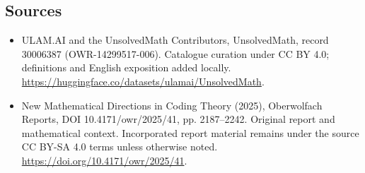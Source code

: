 \documentclass[11pt]{article}
\begin{document}
\subsection{Sources}
\begin{itemize}
\item[\hypertarget{source:30006387:1}{S1}] ULAM.AI and the UnsolvedMath Contributors, UnsolvedMath, record 30006387 (OWR-14299517-006). Catalogue curation under CC BY 4.0; definitions and English exposition added locally.
\url{https://huggingface.co/datasets/ulamai/UnsolvedMath}.
\item[\hypertarget{source:30006387:2}{S2}] New Mathematical Directions in Coding Theory (2025), Oberwolfach Reports, DOI 10.4171/owr/2025/41, pp. 2187--2242. Original report and mathematical context. Incorporated report material remains under the source CC BY-SA 4.0 terms unless otherwise noted.
\url{https://doi.org/10.4171/owr/2025/41}.
\end{itemize}
\label{end:30006387}
\end{document}

